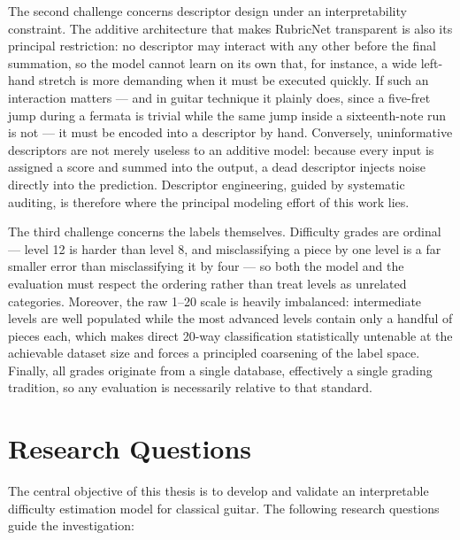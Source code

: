 The second challenge concerns descriptor design under an interpretability constraint. The additive architecture that makes RubricNet transparent is also its principal restriction: no descriptor may interact with any other before the final summation, so the model cannot learn on its own that, for instance, a wide left-hand stretch is more demanding when it must be executed quickly. If such an interaction matters --- and in guitar technique it plainly does, since a five-fret jump during a fermata is trivial while the same jump inside a sixteenth-note run is not --- it must be encoded into a descriptor by hand. Conversely, uninformative descriptors are not merely useless to an additive model: because every input is assigned a score and summed into the output, a dead descriptor injects noise directly into the prediction. Descriptor engineering, guided by systematic auditing, is therefore where the principal modeling effort of this work lies.

The third challenge concerns the labels themselves. Difficulty grades are ordinal --- level 12 is harder than level 8, and misclassifying a piece by one level is a far smaller error than misclassifying it by four --- so both the model and the evaluation must respect the ordering rather than treat levels as unrelated categories. Moreover, the raw 1--20 scale is heavily imbalanced: intermediate levels are well populated while the most advanced levels contain only a handful of pieces each, which makes direct 20-way classification statistically untenable at the achievable dataset size and forces a principled coarsening of the label space. Finally, all grades originate from a single database, effectively a single grading tradition, so any evaluation is necessarily relative to that standard.

\section{Research Questions}
\label{sec:research_questions}
The central objective of this thesis is to develop and validate an interpretable difficulty estimation model for classical guitar. The following research questions guide the investigation:

